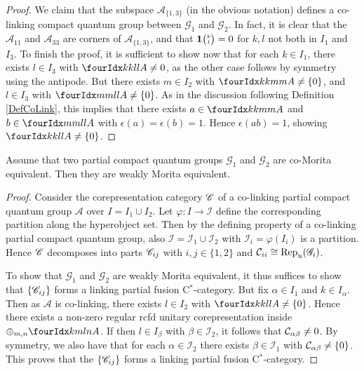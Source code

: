 \begin{proof}
We claim that the subspace $\mathscr{A}_{\{1,3\}}$ (in the obvious notation) defines a co-linking compact quantum group between $\mathscr{G}_1$ and $\mathscr{G}_2$. In fact, it is clear that the $\mathscr{A}_{11}$ and $\mathscr{A}_{33}$ are corners of $\mathscr{A}_{\{1,3\}}$, and that $\mathbf{1}{\tiny {\begin{pmatrix} k\\l\end{pmatrix}}}=0$ for $k,l$ not both in $I_1$ and $I_{3}$. To finish the proof, it is sufficient to show now that for each $k\in I_1$, there exists $l\in I_{3}$ with $\Gr{A}{k}{l}{k}{l}\neq 0$, as the other case follows by symmetry using the antipode. But there exists $m\in I_2$ with $\Gr{A}{k}{m}{k}{m} \neq \{0\}$, and $l\in I_3$ with $\Gr{A}{m}{l}{m}{l}\neq\{0\}$. As in the discussion following Definition \ref{DefCoLink}, this implies that there exists $a\in \Gr{A}{k}{m}{k}{m}$ and $b\in \Gr{A}{m}{l}{m}{l}$ with $\epsilon(a)=\epsilon(b)=1$. Hence $\epsilon(ab)=1$, showing $\Gr{A}{k}{l}{k}{l}\neq \{0\}$.
\end{proof} 


\begin{Prop}\label{PropCoWeak} Assume that two partial compact quantum groups $\mathscr{G}_1$ and $\mathscr{G}_2$ are co-Morita equivalent. Then they are weakly Morita equivalent.
\end{Prop} 
\begin{proof} %
Consider the corepresentation category $\mathscr{C}$ of a co-linking partial compact quantum group $\mathscr{A}$ over $I = I_1\cup I_2$. Let $\varphi:I\rightarrow \mathscr{I}$ define the corresponding partition along the hyperobject set. Then by the defining property of a co-linking partial compact quantum group, also $\mathscr{I} = \mathscr{I}_1\cup \mathscr{I}_2$ with $\mathscr{I}_i=\varphi(I_i)$ is a partition. Hence $\mathscr{C}$ decomposes into parts $\mathscr{C}_{ij}$ with $i,j\in \{1,2\}$ and $\mathcal{C}_{ii}\cong \mathrm{Rep}_u(\mathscr{G}_i)$. 

To show that $\mathscr{G}_1$ and $\mathscr{G}_2$ are weakly Morita equivalent, it thus suffices to show that $\{\mathscr{C}_{ij}\}$ forms a linking partial fusion C$^*$-category. But fix $\alpha\in I_1$ and $k\in I_{\alpha}$. Then as $\mathscr{A}$ is co-linking, there exists $l \in I_2$ with $\Gr{A}{k}{l}{k}{l}\neq \{0\}$. Hence there exists a non-zero regular rcfd unitary corepresentation inside $\oplus_{m,n}\Gr{A}{k}{l}{m}{n}$. If then $l\in I_{\beta}$ with $\beta\in \mathscr{I}_2$, it follows that $\mathcal{C}_{\alpha\beta}\neq 0$. By symmetry, we also have that for each $\alpha \in \mathscr{I}_2$ there exists $\beta \in \mathscr{I}_1$ with $\mathcal{C}_{\alpha\beta}\neq \{0\}$. This proves that the $\{\mathscr{C}_{ij}\}$ forms a linking partial fusion C$^*$-category.
\end{proof}



